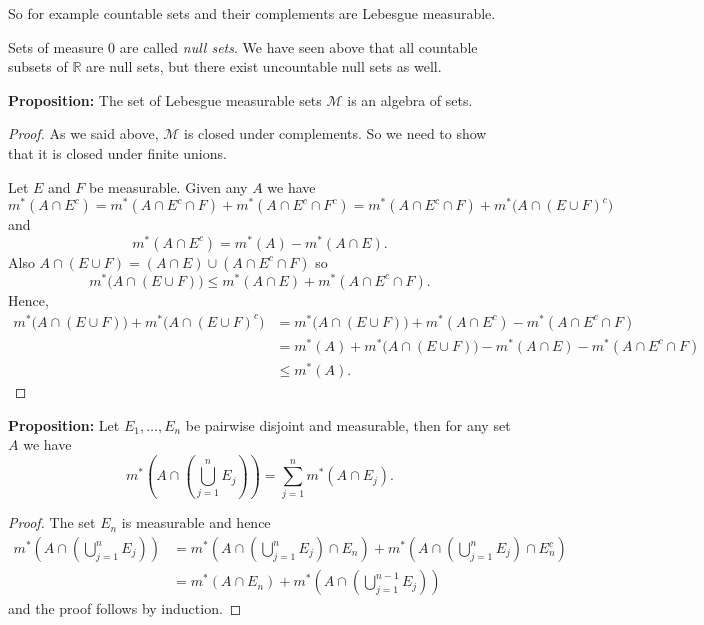 \documentclass[12pt]{book}
\newcommand{\R}{{\mathbb{R}}}
\newcommand{\sM}{{\mathcal{M}}}
\theoremstyle{plain}
\theoremstyle{remark}
\theoremstyle{definition}
\theoremstyle{exercise}
\theoremstyle{example}
\begin{document}
So for example countable sets and their complements are Lebesgue measurable.

\medskip

Sets of measure 0 are called \emph{null sets}.  We have seen above that all
countable subsets of $\R$ are null sets, but there exist 
uncountable null sets as well.

\medskip

\textbf{Proposition:}
The set of Lebesgue measurable sets
$\sM$ is an algebra of sets.

\medskip

\begin{proof}
As we said above, $\sM$ is closed under complements.  So we need to show that
it is closed under finite unions.

Let $E$ and $F$ be measurable.
Given any $A$ we have
$$
m^*(A \cap E^c) =
m^*(A \cap E^c \cap F) +
m^*(A \cap E^c \cap F^c)
=
m^*(A \cap E^c \cap F) +
m^*\bigl(A \cap ( E \cup F)^c \bigr)
$$
and
$$
m^*(A \cap E^c)
=
m^*(A) -
m^*(A \cap E) .
$$
Also
$A \cap (E \cup F) = (A \cap E) \cup (A \cap E^c \cap F)$ so
$$
m^*\bigl(A \cap (E \cup F) \bigr)
\leq
m^*(A \cap E ) +
m^*(A \cap E^c \cap F ) .
$$
Hence,
\begin{equation*}
\begin{split}
m^*\bigl(A \cap (E \cup F) \bigr) +
m^*\bigl(A \cap (E \cup F)^c \bigr)
& =
m^*\bigl(A \cap (E \cup F) \bigr) +
m^*(A \cap E^c ) -
m^*(A \cap E^c \cap F )
\\
& =
m^*(A)
+
m^*\bigl(A \cap (E \cup F) \bigr)
-
m^*(A \cap E ) -
m^*(A \cap E^c \cap F )
\\
& \leq
m^*(A) .
\end{split}
\end{equation*}
\end{proof}

\medskip

\textbf{Proposition:}
Let $E_1, \ldots, E_n$ be pairwise disjoint and measurable, then
for any set $A$ we have
$$
m^*\left( A \cap \left( \bigcup_{j=1}^n E_j \right) \right)
=
\sum_{j=1}^n
m^*( A \cap  E_j ) .
$$

\medskip

\begin{proof}
The set $E_n$ is measurable and hence
\begin{equation*}
\begin{split}
m^*\left( A \cap \left( \bigcup_{j=1}^n E_j \right) \right)
& =
m^*\left( A \cap \left( \bigcup_{j=1}^n E_j \right) \cap E_n \right)
+
m^*\left( A \cap \left( \bigcup_{j=1}^n E_j \right) \cap E_n^c \right)
\\
& =
m^*( A \cap E_n )
+
m^*\left( A \cap \left( \bigcup_{j=1}^{n-1} E_j \right) \right)
\end{split}
\end{equation*}
and the proof follows by induction.
\end{proof}
\end{document}
